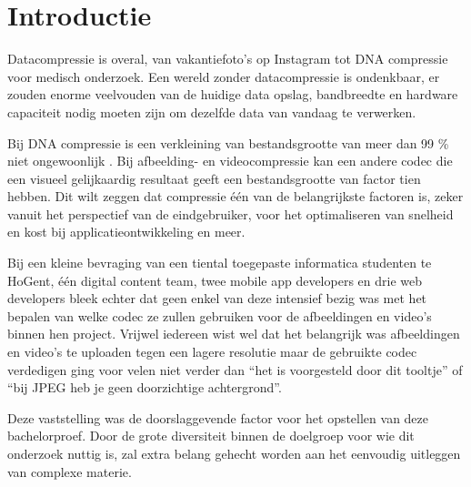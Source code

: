 
\section{Introductie} %
\label{sec:introductie}

Datacompressie is overal, van vakantiefoto's op Instagram tot DNA compressie voor medisch onderzoek. Een wereld zonder datacompressie is ondenkbaar, er zouden enorme veelvouden van de huidige data opslag, bandbreedte en hardware capaciteit nodig moeten zijn om dezelfde data van vandaag te verwerken.

Bij DNA compressie is een verkleining van bestandsgrootte van meer dan 99 \% niet ongewoonlijk \autocite{Afify2011}. Bij afbeelding- en videocompressie kan een andere codec die een visueel gelijkaardig resultaat geeft een bestandsgrootte van factor tien hebben. Dit wilt zeggen dat compressie één van de belangrijkste factoren is, zeker vanuit het perspectief van de eindgebruiker, voor het optimaliseren van snelheid en kost bij applicatieontwikkeling en meer.

Bij een kleine bevraging van een tiental toegepaste informatica studenten te HoGent, één digital content team, twee mobile app developers en drie web developers bleek echter dat geen enkel van deze intensief bezig was met het bepalen van welke codec ze zullen gebruiken voor de afbeeldingen en video’s binnen hen project. Vrijwel iedereen wist wel dat het belangrijk was afbeeldingen en video’s te uploaden tegen een lagere resolutie maar de gebruikte codec verdedigen ging voor velen niet verder dan “het is voorgesteld door dit tooltje” of “bij JPEG heb je geen doorzichtige achtergrond”. 

Deze vaststelling was de doorslaggevende factor voor het opstellen van deze bachelorproef. Door de grote diversiteit binnen de doelgroep voor wie dit onderzoek nuttig is, zal extra belang gehecht worden aan het eenvoudig uitleggen van complexe materie.

